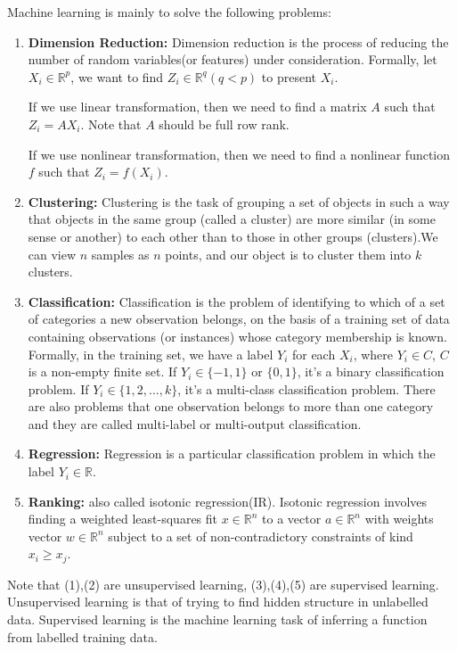 \documentclass[11pt]{article}
\def\BR{{\mathbb R}}
\begin{document}
Machine learning is mainly to solve the following problems:
\begin{enumerate}[(1)]
\item 
\textbf{Dimension Reduction:}
Dimension reduction is the process of reducing the number of random variables(or features) under consideration. Formally, let $X_i \in \BR^p$, we want to find $Z_i \in \BR^q (q < p)$ to present $X_i$.

If we use linear transformation, then we need to find a matrix $A$ such that $Z_i = AX_i$. Note that $A$ should be full row rank.

If we use nonlinear transformation, then we need to find a nonlinear function $f$ such that $Z_i = f(X_i)$.
\item 
\textbf{Clustering:}
Clustering is the task of grouping a set of objects in such a way that objects in the same group (called a cluster) are more similar (in some sense or another) to each other than to those in other groups (clusters).We can view $n$ samples as $n$ points, and our object is to cluster them into $k$ clusters.
\item 
\textbf{Classification:}
Classification is the problem of identifying to which of a set of categories a new observation belongs, on the basis of a training set of data containing observations (or instances) whose category membership is known. Formally, in the training set, we have a label $Y_i$ for each $X_i$, where $Y_i \in C$, $C$ is a non-empty finite set. If $Y_i \in \{-1, 1\}$ or $\{0, 1\}$, it's a binary classification problem. If $Y_i \in \{1, 2, \dots, k\}$, it's a multi-class classification problem. There are also problems that one observation belongs to more than one category and they are called multi-label or multi-output classification.
\item 
\textbf{Regression:}
Regression is a particular classification problem in which the label $Y_i \in \BR$.
\item 
\textbf{Ranking:}
also called isotonic regression(IR). Isotonic regression involves finding a weighted least-squares fit $x \in \BR^n $ to a vector $a \in \BR^n$ with weights vector $w \in \BR^n$ subject to a set of non-contradictory constraints of kind $x_i \geq x_j$.
\end{enumerate}

Note that (1),(2) are unsupervised learning, (3),(4),(5) are supervised learning. Unsupervised learning is that of trying to find hidden structure in unlabelled data. Supervised learning is the machine learning task of inferring a function from labelled training data. 
\end{document}
